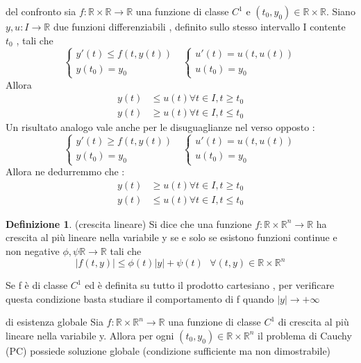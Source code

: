 \documentclass{article}
\theoremstyle{definition}
\newtheorem{definizione}{Definizione}[section]
\newcommand{\R}{\mathbb{R}}
\newcommand{\Rn}{\R^n}
\begin{document}
\begin{teo}{del confronto}{}
sia $f:\R \times \R \rightarrow \R $ una funzione di classe $C^1$ e $(t_0,y_0)\in \R \times \R$. Siano $y,u: I \rightarrow \R$ due funzioni differenziabili , definito sullo stesso intervallo I contente $t_0$ , tali che 
$$\begin{cases}
y'(t)\leq f(t,y(t))\\
y(t_0)=y_0
\end{cases} \ \ \ \begin{cases}
u'(t)=u(t,u(t))\\
u(t_0)=y_0
\end{cases}$$
Allora 
\begin{align*}
y(t) &\leq u(t) \forall t \in I , t \geq t_0 \\
y(t)& \geq u(t) \forall t \in I , t \leq t_0
\end{align*}
Un risultato analogo vale anche per le disuguaglianze nel verso opposto : 
$$\begin{cases}
	y'(t)\geq f(t,y(t))\\
	y(t_0)=y_0
\end{cases} \ \ \ \begin{cases}
	u'(t)=u(t,u(t))\\
	u(t_0)=y_0
\end{cases}$$
Allora ne dedurremmo che : 
\begin{align*}
	y(t) &\geq u(t) \forall t \in I , t \geq t_0 \\
	y(t)& \leq u(t) \forall t \in I , t \leq t_0
\end{align*}
\end{teo}
\begin{definizione} (crescita lineare) \newline
Si dice che una funzione $f: \R \times \Rn \rightarrow \R $ ha crescita al più lineare nella variabile y se e solo se esistono funzioni continue e non negative  $\phi , \psi \R \rightarrow \R $ tali che 
$$|f(t,y)|\leq \phi(t)|y|+\psi(t) \ \ \ \forall (t,y)\in \R\times \Rn $$
\end{definizione}
Se f è di classe $C^1$ ed è definita su tutto il prodotto cartesiano , per verificare questa condizione basta studiare il comportamento di f quando $|y|\rightarrow +\infty$
\begin{teo}{di esistenza globale}{}
	\label{teo:1.5}
	Sia $f: \R \times \Rn \rightarrow \R $ una funzione di classe $C^1$ di crescita al più lineare nella variabile y. Allora per ogni $(t_0,y_0)\in \R \times \Rn$ il problema di Cauchy (PC) possiede soluzione globale (condizione sufficiente ma non dimostrabile)
	\end{teo}
\end{document}
